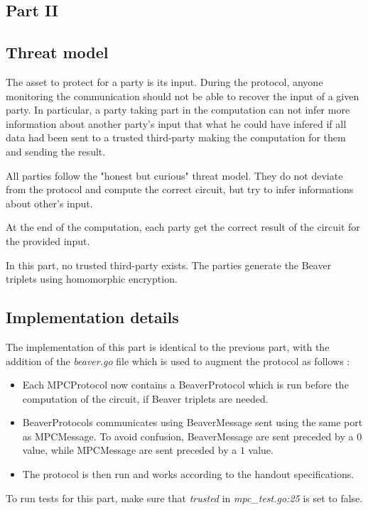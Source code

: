 \documentclass[10pt,conference]{IEEEtran}
\begin{document}
\begin{itemize}
\section{Part II}
\subsection{Threat model}
The asset to protect for a party is its input. During the protocol, anyone monitoring the communication should not be able to recover the input of a given party. In particular, a party taking part in the computation can not infer more information about another party's input that what he could have infered if all data had been sent to a trusted third-party making the computation for them and sending the result.

All parties follow the "honest but curious" threat model. They do not deviate from the protocol and compute the correct circuit, but try to infer informations about other's input.

At the end of the computation, each party get the correct result of the circuit for the provided input.

In this part, no trusted third-party exists. The parties generate the Beaver triplets using homomorphic encryption.

\subsection{Implementation details}
The implementation of this part is identical to the previous part, with the addition of the \textit{beaver.go} file which is used to augment the protocol as follows : 
\begin{itemize}
    \item Each MPCProtocol now contains a BeaverProtocol which is run before the computation of the circuit, if Beaver triplets are needed.
    \item BeaverProtocols communicates using BeaverMessage sent using the same port as MPCMessage. To avoid confusion, BeaverMessage are sent preceded by a $0$ value, while MPCMessage are sent preceded by a $1$ value.
    \item The protocol is then run and works according to the handout specifications.
\end{itemize}
To run tests for this part, make sure that \textit{trusted} in \textit{mpc\_test.go:25} is set to false.


\end{itemize}
\end{document}
